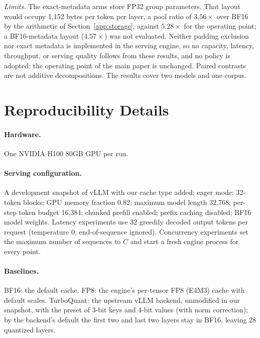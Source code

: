 \documentclass{article}
\begin{document}
\emph{Limits.} The exact-metadata arms store FP32 group parameters. That layout would occupy 1,152
bytes per token per layer, a pool ratio of $3.56\times$ over BF16 by the arithmetic of
Section~\ref{app:storage}, against $5.28\times$ for the operating point; a BF16-metadata layout
($4.57\times$) was not evaluated. Neither padding exclusion nor exact metadata is implemented in the
serving engine, so no capacity, latency, throughput, or serving quality follows from these results, and
no policy is adopted: the operating point of the main paper is unchanged. Paired contrasts are not
additive decompositions. The results cover two models and one corpus.

\FloatBarrier  %
\section{Reproducibility Details}
\label{app:repro}

\paragraph{Hardware.}
One NVIDIA H100 80GB GPU per run.

\paragraph{Serving configuration.}
A development snapshot of vLLM with our cache type added; eager mode; 32-token blocks; GPU memory
fraction 0.82; maximum model length 32,768; per-step token budget 16,384; chunked prefill enabled;
prefix caching disabled; BF16 model weights. Latency experiments use 32 greedily decoded output tokens
per request (temperature 0, end-of-sequence ignored). Concurrency experiments set the maximum number of
sequences to $C$ and start a fresh engine process for every point.

\paragraph{Baselines.}
BF16: the default cache. FP8: the engine's per-tensor FP8 (E4M3) cache with default scales.
TurboQuant: the upstream vLLM backend, unmodified in our snapshot, with the preset of 3-bit keys and
4-bit values (with norm correction); by the backend's default the first two and last two layers stay
in BF16, leaving 28 quantized layers.
\end{document}
